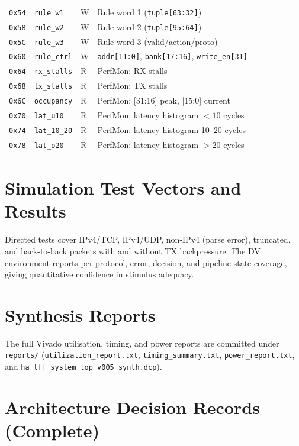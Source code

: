 \documentclass[12pt,twoside,openright]{book}
\begin{document}
\begin{longtable}{llll}
\texttt{0x54} & \texttt{rule\_w1} & W & Rule word 1 (\texttt{tuple[63:32]}) \\
\texttt{0x58} & \texttt{rule\_w2} & W & Rule word 2 (\texttt{tuple[95:64]}) \\
\texttt{0x5C} & \texttt{rule\_w3} & W & Rule word 3 (valid/action/proto) \\
\texttt{0x60} & \texttt{rule\_ctrl} & W & \texttt{addr[11:0]}, \texttt{bank[17:16]}, \texttt{write\_en[31]} \\
\texttt{0x64} & \texttt{rx\_stalls} & R & PerfMon: RX stalls \\
\texttt{0x68} & \texttt{tx\_stalls} & R & PerfMon: TX stalls \\
\texttt{0x6C} & \texttt{occupancy} & R & PerfMon: [31:16] peak, [15:0] current \\
\texttt{0x70} & \texttt{lat\_u10} & R & PerfMon: latency histogram $<10$ cycles \\
\texttt{0x74} & \texttt{lat\_10\_20} & R & PerfMon: latency histogram 10--20 cycles \\
\texttt{0x78} & \texttt{lat\_o20} & R & PerfMon: latency histogram $>20$ cycles \\
\bottomrule
\end{longtable}

\chapter{Simulation Test Vectors and Results}
\label{app:vectors}

Directed tests cover IPv4/TCP, IPv4/UDP, non-IPv4 (parse error), truncated, and back-to-back
packets with and without TX backpressure. The DV environment reports per-protocol, error, decision,
and pipeline-state coverage, giving quantitative confidence in stimulus adequacy.

\chapter{Synthesis Reports}
\label{app:reports}

The full Vivado utilisation, timing, and power reports are committed under \texttt{reports/}
(\texttt{utilization\_report.txt}, \texttt{timing\_summary.txt}, \texttt{power\_report.txt}, and
\texttt{ha\_tff\_system\_top\_v005\_synth.dcp}).

\chapter{Architecture Decision Records (Complete)}
\label{app:adr}
\end{document}
